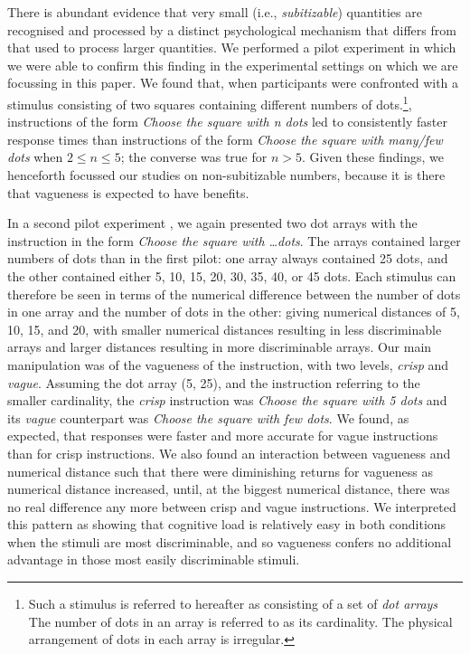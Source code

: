\documentclass[ %
  graybox       %
 ,envcountchap  %
 ,sectrefs      %
]{svmono}
\begin{document}
There is abundant evidence \citep[e.g.,][]{trick1994small} that very small (i.e., \emph{subitizable}) quantities are recognised and processed by a distinct psychological mechanism that differs from that used to process larger quantities. We performed a pilot experiment \citep{green2011costreduction} in which we were able to confirm this finding in the experimental settings on which we are focussing in this paper. We found that, when participants were confronted with a stimulus consisting of two squares containing different numbers of dots.\footnote{Such a stimulus is referred to hereafter as consisting of a set of {\em dot arrays} The number of dots in an array is referred to as its cardinality. The physical arrangement of dots in each array is irregular.}, instructions of the form \emph{Choose the square with \emph{n} dots} led to consistently faster response times than instructions of the form \emph{Choose the square with many/few dots} when $2 \leq n \leq 5$; the converse was true for $n>5$. Given these findings, we henceforth focussed our studies on non-subitizable numbers, because it is there that vagueness is expected to have benefits.

In a second pilot experiment \citep{green2013utility}, we again presented two dot arrays with the instruction in the form \emph{Choose the square with \ldots dots}. The arrays contained larger numbers of dots than in the first pilot: one array always contained 25 dots, and the other contained either 5, 10, 15, 20, 30, 35, 40, or 45 dots. Each stimulus can therefore be seen in terms of the numerical difference between the number of dots in one array and the number of dots in the other: giving numerical distances of 5, 10, 15, and 20, with smaller numerical distances resulting in less discriminable arrays and larger distances resulting in more discriminable arrays. Our main manipulation was of the vagueness of the instruction, with two levels, \emph{crisp} and \emph{vague}. Assuming the dot array (5, 25), and the instruction referring to the smaller cardinality, the \emph{crisp} instruction was \emph{Choose the square with 5 dots} and its \emph{vague} counterpart was \emph{Choose the square with few dots}. We found, as expected, that responses were faster and more accurate for vague instructions than for crisp instructions. We also found an interaction between vagueness and numerical distance such that there were diminishing returns for vagueness as numerical distance increased, until, at the biggest numerical distance, there was no real difference any more between crisp and vague instructions. We interpreted this pattern as showing that cognitive load is relatively easy in both conditions when the stimuli are most discriminable, and so vagueness confers no additional advantage in those most easily discriminable stimuli.
\end{document}
